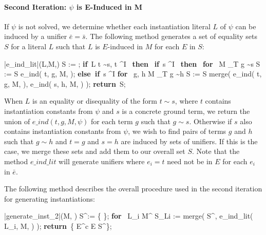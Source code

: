 \documentclass{llncs}
\def\IF{\qtab\keyword{if}\ }
\def\THEN{\ \keyword{then}\ }
\def\ELSEIF{\untab\qtab\keyword{else if}\ }
\def\FI{\untab}
\def\RETURN{\keyword{return}\ }
\def\ENDPROC{\untab}
\def\DOFOR{\qtab\keyword{for}\ }
\def\ENDFOR{\untab}
\def\keyword#1{\mbox{\normalshape\bf #1}}
\begin{document}
\paragraph{Second Iteration: $\psi$ is E-Induced in M}

If $\psi$ is not solved, we determine whether each instantiation literal $L$ of $\psi$ can be induced by a unifier $\bar{e} = \bar{s}$.
The following method generates a set of equality sets $S$ for a literal $L$ such that $L$ is $E$-induced in $M$ for each $E$ in $S$:

\begin{minipage}[t]{.4\linewidth}
\begin{program}
\PROC |e\_ind\_lit|(L,M,\psi) \BODY
  S := \emptyset;
  \IF L  t \sim s, t \mapsto^I \psi \THEN
    \IF s \mapsto^I \emptyset \THEN
      \DOFOR {} M \models_T g \sim s
        S := S \cup e\_ind( t, g, M, \psi );
      \ENDFOR
    \ELSEIF s \mapsto^I \psi
      \DOFOR {} g, h  M \models_T g \sim h
        S := S \cup merge( e\_ind( t, g, M, \psi ), e\_ind( s, h, M, \psi ) );
      \ENDFOR 
    \FI
  \FI
  \RETURN S;
\ENDPROC
\end{program}
\end{minipage}

When $L$ is an equality or disequality of the form $t \sim s$, where $t$ contains instantiation constants from $\psi$ and $s$ is a concrete ground term, we return the union of $e\_ind( t, g, M, \psi )$ for each term $g$ such that $g \sim s$.
Otherwise if $s$ also contains instantiation constants from $\psi$, we wish to find pairs of terms $g$ and $h$ such that $g \sim h$ and $t = g$ and $s = h$ are induced by sets of unifiers.
If this is the case, we merge these sets and add them to our overall set $S$.
Note that the method $e\_ind\_lit$ will generate unifiers where $e_i = t$ need not be in $E$ for each $e_i$ in $\bar{e}$.

The following method describes the overall procedure used in the second iteration for generating instantiations:

\begin{minipage}[t]{.4\linewidth}
\begin{program}
\PROC |generate\_inst\_2|(M, \psi) \BODY
S^\ast := \{ \emptyset \};
\DOFOR {} L_i \in M^\psi
  S_{Li} := merge( S^\ast, e\_ind\_lit( L_i, M, \psi ) );
\ENDFOR
\RETURN \{ E^c \mid E \in S^\ast \};
\ENDPROC
\end{program}
\end{minipage}
\end{document}
